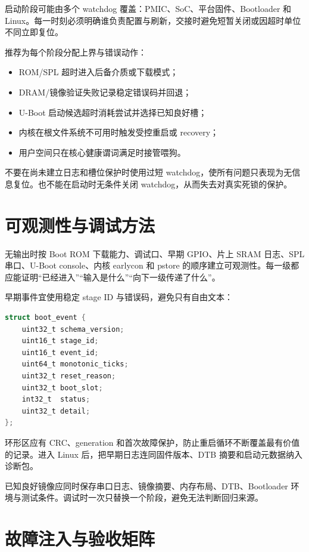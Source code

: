 启动阶段可能由多个 watchdog 覆盖：PMIC、SoC、平台固件、Bootloader 和 Linux。每一时刻必须明确谁负责配置与刷新，交接时避免短暂关闭或因超时单位不同立即复位。

推荐为每个阶段分配上界与错误动作：

\begin{itemize}
  \item ROM/SPL 超时进入后备介质或下载模式；
  \item DRAM/镜像验证失败记录稳定错误码并回退；
  \item U-Boot 启动候选超时消耗尝试并选择已知良好槽；
  \item 内核在根文件系统不可用时触发受控重启或 recovery；
  \item 用户空间只在核心健康谓词满足时接管喂狗。
\end{itemize}

不要在尚未建立日志和槽位保护时使用过短 watchdog，使所有问题只表现为无信息复位。也不能在启动时无条件关闭 watchdog，从而失去对真实死锁的保护。

\section{可观测性与调试方法}

无输出时按 Boot ROM 下载能力、调试口、早期 GPIO、片上 SRAM 日志、SPL 串口、U-Boot console、内核 earlycon 和 pstore 的顺序建立可观测性。每一级都应能证明“已经进入”“输入是什么”“向下一级传递了什么”。

早期事件宜使用稳定 stage ID 与错误码，避免只有自由文本：

\begin{lstlisting}[language=C,caption={启动事件记录的逻辑结构}]
struct boot_event {
    uint32_t schema_version;
    uint16_t stage_id;
    uint16_t event_id;
    uint64_t monotonic_ticks;
    uint32_t reset_reason;
    uint32_t boot_slot;
    int32_t  status;
    uint32_t detail;
};
\end{lstlisting}

环形区应有 CRC、generation 和首次故障保护，防止重启循环不断覆盖最有价值的记录。进入 Linux 后，把早期日志连同固件版本、DTB 摘要和启动元数据纳入诊断包。

已知良好镜像应同时保存串口日志、镜像摘要、内存布局、DTB、Bootloader 环境与测试条件。调试时一次只替换一个阶段，避免无法判断回归来源。

\section{故障注入与验收矩阵}

